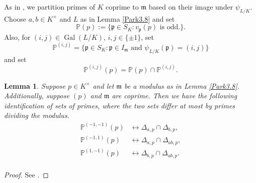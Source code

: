 \documentclass[12pt,reqno]{amsart}
\newcommand{\mm}{\mathfrak{m}}
\newcommand{\OO}{\mathcal{O}}
\newcommand{\pp}{\mathfrak{p}}
\newcommand{\PP}{\mathbb{P}}
\DeclareMathOperator{\Gal}{Gal}
\newtheorem{lem}[thm]{Lemma}
\theoremstyle{definition}
\newtheorem{defn}[thm]{Definition}
\begin{document}
As in \cite{Park}, we partition primes of $K$ coprime to $\mm$ based on their image under $\psi_{L/K}$. Choose $a,b\in K^{\times}$ and $L$ as in Lemma \ref{Park3.8} and set
\[
\PP(p):=\{\pp \in S_K: v_{\pp}(p) \text { is odd}.\}.
\]
Also, for $(i,j)\in \Gal(L/K)$, $i,j\in \{\pm1\}$, set 
\[
\PP^{(i,j)}=\{\pp\in S_K:\pp\in I_{\mm} \text{ and }\psi_{L/K}(\pp)=(i,j)\}
\]
and set 
\[
\PP^{(i,j)}(p)=\PP(p)\cap\PP^{(i,j)}. 
\]

\begin{lem}\label{uptomodulus}
  Suppose $p\in K^{\times}$ and let $\mm$ be a modulus as in Lemma
  \ref{Park3.8}. Additionally, suppose $(p)$ and $\mm$ are
  coprime. Then we have the following identification of sets of
  primes, where the two sets differ at most by primes dividing the
 modulus.
\begin{align*}
\PP^{(-1,-1)}(p) &\leftrightarrow \Delta_{a,p}\cap \Delta_{b,p}, \\
\PP^{(-1,1)}(p) &\leftrightarrow \Delta_{a,p}\cap \Delta_{ab,p},  \\ 
\PP^{(1,-1)}(p) &\leftrightarrow \Delta_{b,p}\cap \Delta_{ab,p}.\\
\end{align*}
\end{lem}
\begin{proof}
See \cite[Lemma 3.9]{Park}. 
\end{proof}



\end{document}
